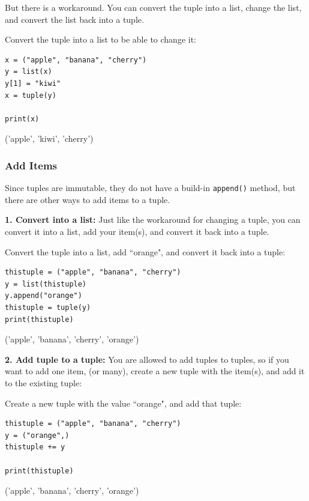 \documentclass[12pt,a4paper]{article}
\newcommand{\code}[1]{%
	\colorbox{backcolour}{\lstinline{#1}}%
}
\begin{document}
But there is a workaround. You can convert the tuple into a list, change the
list, and convert the list back into a tuple.

\begin{ebox}
Convert the tuple into a list to be able to change it:
	\begin{lstlisting}
x = ("apple", "banana", "cherry")
y = list(x)
y[1] = "kiwi"
x = tuple(y)

print(x)
	\end{lstlisting}
\tcblower
	\begin{vercode}
('apple', 'kiwi', 'cherry')
	\end{vercode}
\end{ebox}
\subsubsection{Add Items}

Since tuples are immutable, they do not have a build-in \code{append()} method,
but there are other ways to add items to a tuple.

\quad
\textbf{1. Convert into a list:}
		Just like the workaround for changing a tuple, you can convert it into
		a list, add your item(s), and convert it back into a tuple.

\begin{ebox}
Convert the tuple into a list, add ``orange", and convert it back into a tuple:
	\begin{lstlisting}
thistuple = ("apple", "banana", "cherry")
y = list(thistuple)
y.append("orange")
thistuple = tuple(y)
print(thistuple)
	\end{lstlisting}
\tcblower
	\begin{vercode}
('apple', 'banana', 'cherry', 'orange')
	\end{vercode}
\end{ebox}

\quad
\textbf{2. Add tuple to a tuple:}
You are allowed to add tuples to tuples, so if you want to add one item, (or
many), create a new tuple with the item(s), and add it to the existing tuple:

\begin{ebox}
Create a new tuple with the value ``orange", and add that tuple:
	\begin{lstlisting}
thistuple = ("apple", "banana", "cherry")
y = ("orange",)
thistuple += y

print(thistuple)
	\end{lstlisting}
\tcblower
	\begin{vercode}
('apple', 'banana', 'cherry', 'orange')
	\end{vercode}
\end{ebox}
\end{document}
